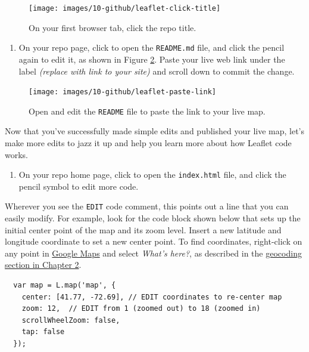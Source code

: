 \documentclass[
  english,
]{book}
\providecommand{\tightlist}{%
  \setlength{\itemsep}{0pt}\setlength{\parskip}{0pt}}
\begin{document}
\begin{figure}
\texttt{[image: images/10-github/leaflet-click-title]} \caption{On your first browser tab, click the repo title.}\label{fig:leaflet-click-title}
\end{figure}

\begin{enumerate}
\def\labelenumi{\arabic{enumi}.}
\setcounter{enumi}{13}
\tightlist
\item
  On your repo page, click to open the \texttt{README.md} file, and click the pencil again to edit it, as shown in Figure \ref{fig:leaflet-paste-link}. Paste your live web link under the label \emph{(replace with link to your site)} and scroll down to commit the change.
\end{enumerate}



\begin{figure}
\texttt{[image: images/10-github/leaflet-paste-link]} \caption{Open and edit the \texttt{README} file to paste the link to your live map.}\label{fig:leaflet-paste-link}
\end{figure}

Now that you've successfully made simple edits and published your live map, let's make more edits to jazz it up and help you learn more about how Leaflet code works.

\begin{enumerate}
\def\labelenumi{\arabic{enumi}.}
\setcounter{enumi}{14}
\tightlist
\item
  On your repo home page, click to open the \texttt{index.html} file, and click the pencil symbol to edit more code.
\end{enumerate}

Wherever you see the \texttt{EDIT} code comment, this points out a line that you can easily modify. For example, look for the code block shown below that sets up the initial center point of the map and its zoom level. Insert a new latitude and longitude coordinate to set a new center point. To find coordinates, right-click on any point in \href{https://google.com/maps}{Google Maps} and select \emph{What's here?}, as described in the \href{geocode.html}{geocoding section in Chapter 2}.

\begin{verbatim}
  var map = L.map('map', {
    center: [41.77, -72.69], // EDIT coordinates to re-center map
    zoom: 12,  // EDIT from 1 (zoomed out) to 18 (zoomed in)
    scrollWheelZoom: false,
    tap: false
  });
\end{verbatim}
\end{document}

